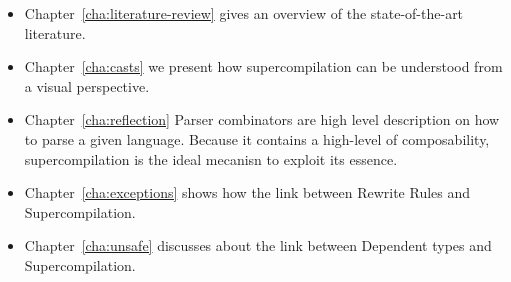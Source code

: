 \begin{itemize}

\item Chapter~\ref{cha:literature-review} gives an overview of the state-of-the-art literature.

\item Chapter~\ref{cha:casts} we present how supercompilation can be understood from a visual perspective.

\item Chapter~\ref{cha:reflection} Parser combinators are high level description on how to parse a given language.
Because it contains a high-level of composability, supercompilation is the ideal mecanisn to exploit its essence.

\item Chapter~\ref{cha:exceptions} shows how the link between Rewrite Rules and Supercompilation.

\item Chapter~\ref{cha:unsafe} discusses about the link between Dependent types and Supercompilation.

\end{itemize}
